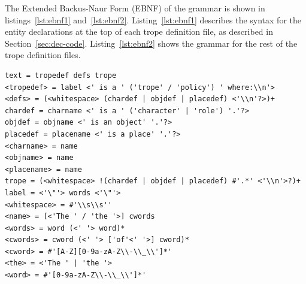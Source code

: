 \documentclass[11pt]{report}
\begin{document}

The Extended Backus-Naur Form (EBNF) of the grammar is shown in
listings~\ref{lst:ebnf1} and~\ref{lst:ebnf2}. Listing~\ref{lst:ebnf1} describes
the syntax for the entity declarations at the top of each trope definition file,
as described in Section~\ref{sec:dec-code}. Listing~\ref{lst:ebnf2} shows the
grammar for the rest of the trope definition files.

\begin{lstlisting}[showstringspaces=false,label={lst:ebnf1},caption={EBNF
grammar for the entity declarations in TropICAL}]
text = tropedef defs trope
<tropedef> = label <' is a ' ('trope' / 'policy') ' where:\\n'>
<defs> = (<whitespace> (chardef | objdef | placedef) <'\\n'?>)+
chardef = charname <' is a ' ('character' | 'role') '.'?>
objdef = objname <' is an object' '.'?>
placedef = placename <' is a place' '.'?>
<charname> = name
<objname> = name
<placename> = name
trope = (<whitespace> !(chardef | objdef | placedef) #'.*' <'\\n'>?)+
label = <'\"'> words <'\"'>
<whitespace> = #'\\s\\s''
<name> = [<'The ' / 'the '>] cwords
<words> = word (<' '> word)*
<cwords> = cword (<' '> ['of'<' '>] cword)*
<cword> = #'[A-Z][0-9a-zA-Z\\-\\_\\']*'
<the> = <'The ' | 'the '>
<word> = #'[0-9a-zA-Z\\-\\_\\']*'
\end{lstlisting}
\end{document}
